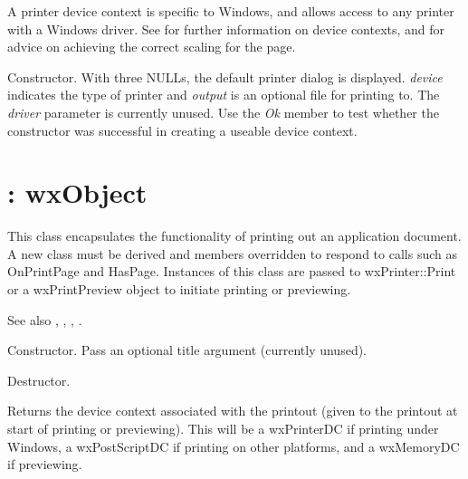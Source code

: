 A printer device context is specific to Windows, and allows access to
any printer with a Windows driver. See  for further information
on device contexts, and  for advice on
achieving the correct scaling for the page.



Constructor.  With three NULLs, the default printer dialog is
displayed. {\it device} indicates the type of printer and {\it output}
is an optional file for printing to. The {\it driver} parameter is
currently unused.  Use the {\it Ok} member to test whether the
constructor was successful in creating a useable device context.

\section{: wxObject}\label{wxprintout}


This class encapsulates the functionality of printing out an
application document. A new class must be derived and members
overridden to respond to calls such as OnPrintPage and HasPage.
Instances of this class are passed to wxPrinter::Print or a
wxPrintPreview object to initiate printing or previewing.

See also , ,\rtfsp
{}, .



Constructor. Pass an optional title argument (currently unused).



Destructor.



Returns the device context associated with the printout (given to the printout at start of
printing or previewing). This will be a wxPrinterDC if printing under Windows,
a wxPostScriptDC if printing on other platforms, and a wxMemoryDC if previewing.


